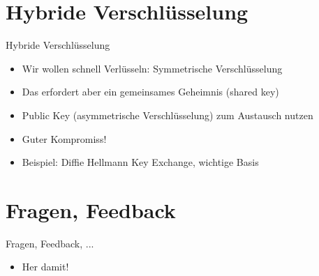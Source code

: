 \section{Hybride Verschlüsselung}
  \begin{frame}{Hybride Verschlüsselung}
    \begin{itemize}
      \item{Wir wollen schnell Verlüsseln: Symmetrische Verschlüsselung}
      \item{Das erfordert aber ein gemeinsames Geheimnis (shared key)}
      \item{Public Key (asymmetrische Verschlüsselung) zum Austausch nutzen}
      \item{Guter Kompromiss!}
      \item{Beispiel: Diffie Hellmann Key Exchange, wichtige Basis}
    \end{itemize}
  \end{frame}
\section{Fragen, Feedback}
  \begin{frame}{Fragen, Feedback, ...}
    \begin{itemize}
      \item{Her damit!}
    \end{itemize}
  \end{frame}

